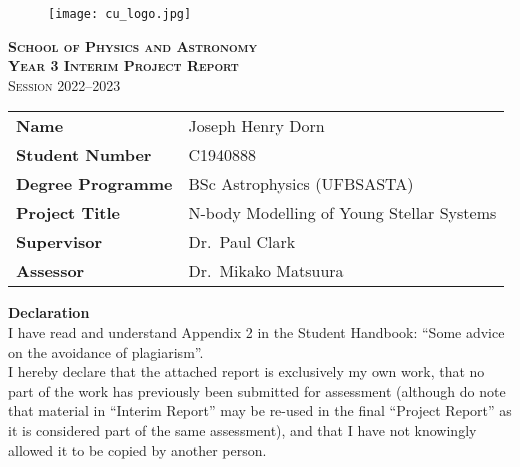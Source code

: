 \begin{center}

\vspace*{4em}

\begin{figure}
    \centering
    \texttt{[image: cu\_logo.jpg]}
\end{figure}

\vspace*{0em}

{\huge\scshape\bfseries School of Physics and Astronomy}\\
\vspace*{2em}
{\Huge\scshape\bfseries Year 3 Interim Project Report}\\
\vspace*{1em}
{\LARGE\scshape Session 2022--2023}\\

\vspace*{4em}

\begin{tabularx}{0.8\textwidth} { 
    | >{\raggedright\arraybackslash\bfseries}l 
      >{\raggedleft\arraybackslash}X }
    Name & Joseph Henry Dorn \\ [0.5ex]
    Student Number  & C1940888 \\ [0.5ex]
    Degree Programme  & BSc Astrophysics (UFBSASTA) \\ [0.5ex]
    Project Title  & N-body Modelling of Young Stellar Systems \\ [0.5ex]
    Supervisor  & Dr.\ Paul Clark \\ [0.5ex]
    Assessor  & Dr.\ Mikako Matsuura \\ [0.5ex]
\end{tabularx}

\vspace*{8em}

\begin{adjustwidth}{0.1\textwidth}{0.1\textwidth}
    
    {\large\bfseries Declaration} \\ [0ex]
    I have read and understand Appendix 2 in the Student Handbook: “Some advice on the avoidance of plagiarism”. \\ [2ex] 
    I hereby declare that the attached report is exclusively my own work, that no part of the work has previously been submitted for assessment (although do note that material in “Interim Report” may be re-used in the final “Project Report” as it is considered part of the same assessment), and that I have not knowingly allowed it to be copied by another person.

\end{adjustwidth}

\end{center}

\thispagestyle{empty} %
\clearpage\setcounter{page}{1} %
